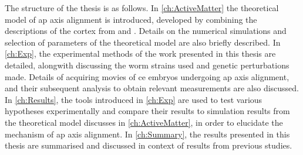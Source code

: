 The structure of the thesis is as follows. In \autoref{ch:ActiveMatter} the theoretical model of \ac{ap} axis alignment is introduced, developed by combining the descriptions of the cortex from \cite{gross2019guiding} and \cite{reymann2016cortical}. Details on the numerical simulations and selection of parameters of the theoretical model are also briefly described. In \autoref{ch:Exp}, the experimental methods of the work presented in this thesis are detailed, alongwith discussing the worm strains used and genetic perturbations made. Details of acquiring movies of \ac{ce} embryos undergoing \ac{ap} axis alignment, and their subsequent analysis to obtain relevant measurements are also discussed. In \autoref{ch:Results}, the tools introduced in \autoref{ch:Exp} are used to test various hypotheses experimentally and compare their results to simulation results from the theoretical model discusses in \autoref{ch:ActiveMatter}, in order to elucidate the mechanism of \ac{ap} axis alignment. In \autoref{ch:Summary}, the results presented in this thesis are summarised and discussed in context of results from previous studies. 

